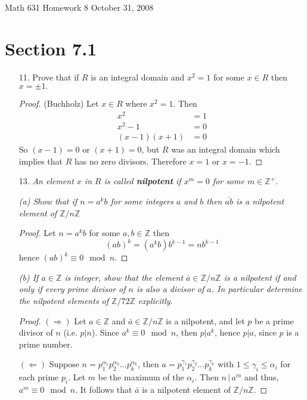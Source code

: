 \documentclass[10pt]{article}
\newcommand{\Z}{\mathbb{Z}}
\newcommand{\divides}{\, \Big | \,}
\newcommand\header{{\sc Math 631 \hfill Homework 8 \hfill October 31, 2008}}
\begin{document}
\header  


\section*{Section 7.1}

\begin{itemize}

\item[11.]  Prove that if $R$ is an integral domain and $x^2=1$ for some $x\in R$ then $x=\pm 1.$

\begin{proof}(Buchholz)
Let $x\in R$ where $x^2=1$.  Then
\begin{align*} 
x^2&=1\\
x^2-1&=0\\
(x-1)(x+1)&=0
\end{align*}
So $(x-1)=0$ or $(x+1)=0$, but $R$ was an integral domain which implies that $R$ has no zero divisors.  Therefore $x=1$ or $x=-1$.
\end{proof}

\item[13.]\emph{An element $x$ in $R$ is called {\bf
nilpotent} if $x^m=0$ for some $m\in \Z^+$.}

\emph{(a) Show that if $n=a^kb$ for some integers $a$ and $b$ then
$\overline{ab}$ is a nilpotent element of $\Z/n\Z$}
\begin{proof}
Let $n=a^kb$ for some $a,b\in \Z$ then
$$(ab)^k=(a^kb)b^{k-1}=nb^{k-1}$$
hence $(ab)^k\equiv 0\mod n$.
\end{proof}

\emph{(b) If $a\in \Z$ is integer, show that the element
$\bar{a}\in\Z/n\Z$ is a nilpotent if and only if every prime
divisor of $n$ is also a divisor of $a$. In particular determine
the nilpotent elements of $\Z/72\Z$ explicitly.}
\begin{proof}
$(\Rightarrow)$ Let $a\in \Z$ and  $\bar{a}\in\Z/n\Z$ is a
nilpotent, and let $p$ be a prime divisor of $n$ (i.e. $p\big|n$).
Since $a^k\equiv 0\mod n$, then $p\big|a^k$, hence $p\big|a$,
since $p$ is a prime number.

$(\Leftarrow)$  Suppose $n=p_1^{\alpha_1}p_2^{\alpha_2}...p_k^{\alpha_k}$, 
then $a = p_1^{\gamma_1}p_2^{\gamma_2}...p_k^{\gamma_k}$ with
$1 \leq \gamma_i \le \alpha_i$ for each prime $p_i$.  Let $m$ be the maximum
of the $\alpha_i$.  Then $n \divides a^m$ and thus, $a^m \equiv 0 \mod n$.  
It follows that $\bar{a}$ is a nilpotent element of $\Z/n\Z$.
\end{proof}


\end{itemize}
\end{document}

